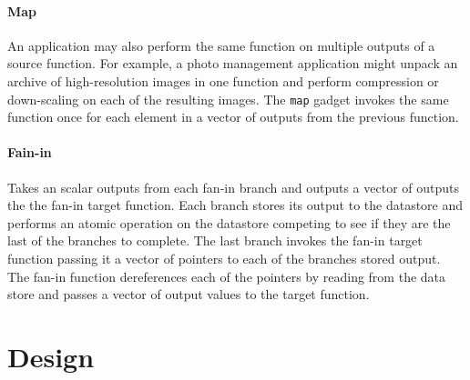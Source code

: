 \paragraph{Map}
An application may also perform the same function on multiple outputs of a
source function. For example, a photo management application might unpack an
archive of high-resolution images in one function and perform compression or
down-scaling on each of the resulting images. The \texttt{map} gadget invokes
the same function once for each element in a vector of outputs from the
previous function. 


\paragraph{Fain-in}
Takes an scalar outputs from each fan-in branch and outputs a vector of
outputs the the fan-in target function. Each branch stores its output to the
datastore and performs an atomic operation on the datastore competing to see if
they are the last of the branches to complete. The last branch invokes the
fan-in target function passing it a vector of pointers to each of the branches
stored output. The fan-in function dereferences each of the pointers by reading
from the data store and passes a vector of output values to the target function.


\section{Design}\label{sec:design}

